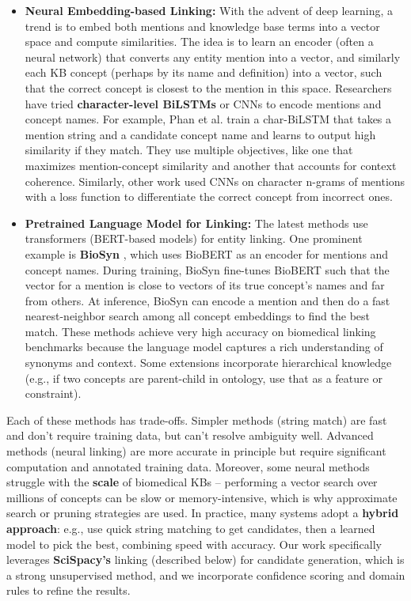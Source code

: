 \begin{itemize}
\item \textbf{Neural Embedding-based Linking:} With the advent of deep learning, a trend is to embed both mentions and knowledge base terms into a vector space and compute similarities. The idea is to learn an encoder (often a neural network) that converts any entity mention into a vector, and similarly each KB concept (perhaps by its name and definition) into a vector, such that the correct concept is closest to the mention in this space. Researchers have tried \textbf{character-level BiLSTMs} or CNNs to encode mentions and concept names. For example, Phan et al. \cite{Phan2019} train a char-BiLSTM that takes a mention string and a candidate concept name and learns to output high similarity if they match. They use multiple objectives, like one that maximizes mention-concept similarity and another that accounts for context coherence. Similarly, other work used CNNs on character n-grams of mentions with a loss function to differentiate the correct concept from incorrect ones.

\item \textbf{Pretrained Language Model for Linking:} The latest methods use transformers (BERT-based models) for entity linking. One prominent example is \textbf{BioSyn} \cite{Sung2020}, which uses BioBERT as an encoder for mentions and concept names. During training, BioSyn fine-tunes BioBERT such that the vector for a mention is close to vectors of its true concept's names and far from others. At inference, BioSyn can encode a mention and then do a fast nearest-neighbor search among all concept embeddings to find the best match. These methods achieve very high accuracy on biomedical linking benchmarks because the language model captures a rich understanding of synonyms and context. Some extensions incorporate hierarchical knowledge (e.g., if two concepts are parent-child in ontology, use that as a feature or constraint).
\end{itemize}

Each of these methods has trade-offs. Simpler methods (string match) are fast and don't require training data, but can't resolve ambiguity well. Advanced methods (neural linking) are more accurate in principle but require significant computation and annotated training data. Moreover, some neural methods struggle with the \textbf{scale} of biomedical KBs – performing a vector search over millions of concepts can be slow or memory-intensive, which is why approximate search or pruning strategies are used. In practice, many systems adopt a \textbf{hybrid approach}: e.g., use quick string matching to get candidates, then a learned model to pick the best, combining speed with accuracy. Our work specifically leverages \textbf{SciSpacy's} linking (described below) for candidate generation, which is a strong unsupervised method, and we incorporate confidence scoring and domain rules to refine the results.

